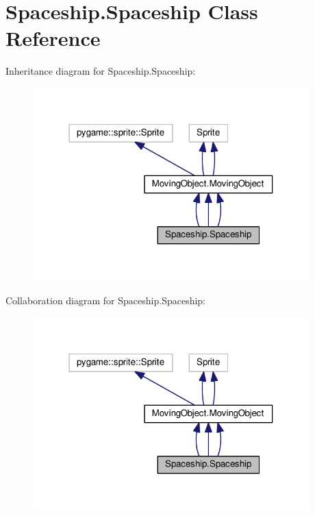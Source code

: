\hypertarget{classSpaceship_1_1Spaceship}{}\section{Spaceship.\+Spaceship Class Reference}
\label{classSpaceship_1_1Spaceship}


Inheritance diagram for Spaceship.\+Spaceship\+:\nopagebreak
\begin{figure}[H]
\begin{center}
\leavevmode
\includegraphics[width=303pt]{classSpaceship_1_1Spaceship__inherit__graph}
\end{center}
\end{figure}


Collaboration diagram for Spaceship.\+Spaceship\+:\nopagebreak
\begin{figure}[H]
\begin{center}
\leavevmode
\includegraphics[width=303pt]{classSpaceship_1_1Spaceship__coll__graph}
\end{center}
\end{figure}
